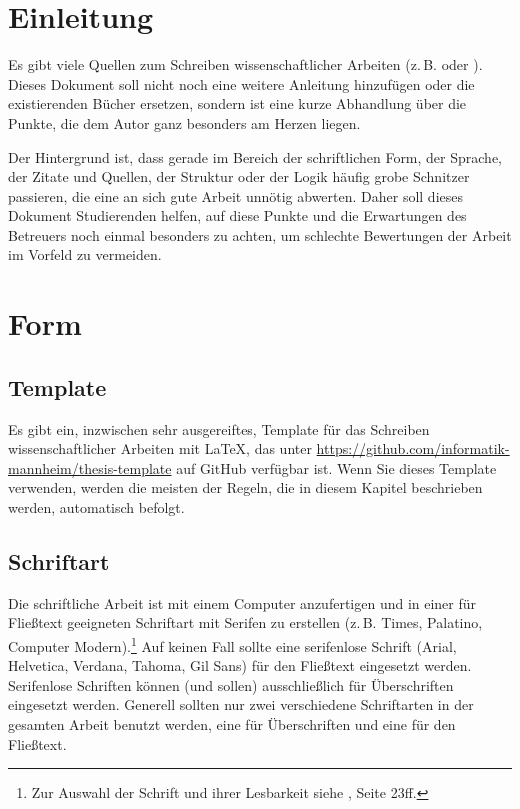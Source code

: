 \documentclass[a4paper,11pt,headings=normal]{scrartcl}
\begin{document}
\newpage
{}

\section{Einleitung}
Es gibt viele Quellen zum Schreiben wissenschaftlicher Arbeiten (z.\,B. \autocite{Kramer2009} oder \autocite{Kornmeier2011}). Dieses Dokument soll nicht noch eine weitere Anleitung hinzufügen oder die existierenden Bücher ersetzen, sondern ist eine kurze Abhandlung über die Punkte, die dem Autor ganz besonders am Herzen liegen.

Der Hintergrund ist, dass gerade im Bereich der schriftlichen Form, der Sprache, der Zitate und Quellen, der Struktur oder der Logik häufig grobe Schnitzer passieren, die eine an sich gute Arbeit unnötig abwerten. Daher soll dieses Dokument Studierenden helfen, auf diese Punkte und die Erwartungen des Betreuers noch einmal besonders zu achten, um schlechte Bewertungen der Arbeit im Vorfeld zu vermeiden.


\section{Form}

\subsection{Template}
Es gibt ein, inzwischen sehr ausgereiftes, Template für das Schreiben wissenschaftlicher Arbeiten mit \LaTeX, das unter \url{https://github.com/informatik-mannheim/thesis-template} auf GitHub verfügbar ist. Wenn Sie dieses Template verwenden, werden die meisten der Regeln, die in diesem Kapitel beschrieben werden, automatisch befolgt.

\subsection{Schriftart}
Die schriftliche Arbeit ist mit einem Computer anzufertigen und in einer für Fließtext geeigneten Schriftart mit Serifen zu erstellen (z.\,B. Times, Palatino, Computer Modern).\footnote{Zur Auswahl der Schrift und ihrer Lesbarkeit siehe \autocite{Willberg1999}, Seite 23ff.} Auf keinen Fall sollte eine serifenlose Schrift (Arial, Helvetica, Verdana, Tahoma, Gil Sans) für den Fließtext eingesetzt werden. Serifenlose Schriften können (und sollen) ausschließlich für Überschriften eingesetzt werden. Generell sollten nur zwei verschiedene Schriftarten in der gesamten Arbeit benutzt werden, eine für Überschriften und eine für den Fließtext.
\end{document}
